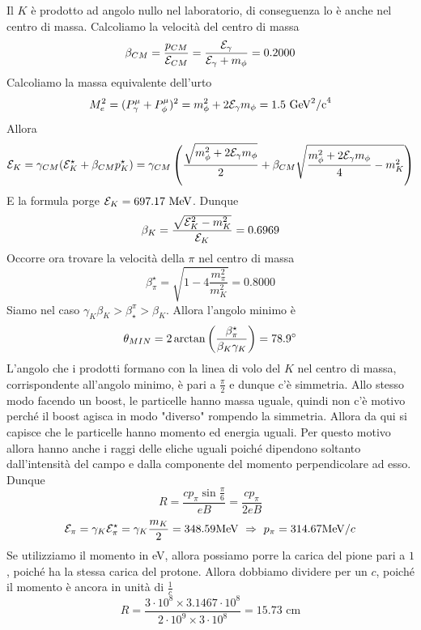 \documentclass[12pt,twoside,a4]{article}
\begin{document}
\begin{solution}
Il $K$ è prodotto ad angolo nullo nel laboratorio, di conseguenza lo è anche nel centro di massa. Calcoliamo la velocità  del centro di massa 
$$ \beta_{CM} = \frac{p_{CM}}{\mathcal{E}_{CM}} = \frac{\mathcal{E}_\gamma}{ \mathcal{E}_\gamma + m_\phi} = 0.2000$$
Calcoliamo la massa equivalente dell'urto
$$ M_e^2 = (P^\mu_\gamma + P^\mu_\phi)^2 = m^2_\phi + 2\mathcal{E}_\gamma m_\phi = 1.5 \mbox{ GeV}^2 \mbox{/c}^4$$
Allora 
$$ \mathcal{E}_K = \gamma_{CM} (\mathcal{E}_K^\star + \beta_{CM} p_K^\star) = \gamma_{CM} \left({\frac{\sqrt{m^2_\phi + 2\mathcal{E}_\gamma m_\phi}}{2} + \beta_{CM} \sqrt{ \frac{m^2_\phi + 2\mathcal{E}_\gamma m_\phi}{4} -m_K^2}}\right)$$
E la formula porge $\mathcal{E}_K = 697.17 \ \mathrm{MeV}$. Dunque
$$ \beta_K = \frac{\sqrt{\mathcal{E}_K^2 - m_K^2}}{\mathcal{E}_K} = 0.6969$$
Occorre ora trovare la velocità  della $\pi$ nel centro di massa 
$$ \beta_\pi^\star = \sqrt{1 - 4\frac{m^2_\pi}{m^2_K}} = 0.8000$$
Siamo nel caso $\gamma_{K} \beta_{K} > \beta_\star^\pi > \beta_K$. Allora l'angolo minimo è
$$ \theta_{MIN} = 2 \arctan \left({\frac{\beta^\star_\pi}{\beta_{K} \gamma_{K}}}\right) = 78.9^\circ$$
L'angolo che i prodotti formano con la linea di volo del $K$ nel centro di massa, corrispondente all'angolo minimo, è pari a $\frac{\pi}{2}$ e dunque c'è simmetria. Allo stesso modo facendo un boost, le particelle hanno massa uguale, quindi non c'è motivo perché il boost agisca in modo "diverso" rompendo la simmetria. Allora da qui si capisce che le particelle hanno momento ed energia uguali. Per questo motivo allora hanno anche i raggi delle eliche uguali poiché dipendono soltanto dall'intensità  del campo e dalla componente del momento perpendicolare ad esso. Dunque
$$ R = \frac{c p_\pi \sin \frac{\pi}{6}}{ e B} = \frac{c p_\pi}{2 e B} $$ 
$$ \mathcal{E}_\pi = \gamma_K \mathcal{E}_\pi^\star = \gamma_K \frac{m_K}{2} = 348.59 \mathrm{MeV}  \  \Rightarrow  \  p_\pi = 314.67 \mathrm{MeV}/c$$
Se utilizziamo il momento in eV, allora possiamo porre la carica del pione pari a $1$, poiché ha la stessa carica del protone. Allora dobbiamo dividere per un $c$, poiché il momento è ancora in unità  di $\frac{1}{c}$
$$ R = \frac{3 \cdot 10^8 \times 3.1467 \cdot 10^8 }{2 \cdot 10^9 \times 3 \cdot 10^8} =15.73 \mbox{ cm}$$
\end{solution}
\end{document}
